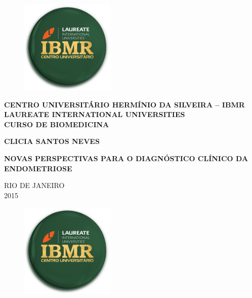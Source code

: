 \documentclass[12pt]{article} %
\begin{document}
\begin{figure}[h!]
\centering
\includegraphics[width=4.5cm]{ibmr.png}
\end{figure}

\begin{center}
\textbf{CENTRO UNIVERSITÁRIO HERMÍNIO DA SILVEIRA – IBMR \\
LAUREATE INTERNATIONAL UNIVERSITIES \\
CURSO DE BIOMEDICINA}
\end{center}

\vspace{2.5cm}

\begin{center}
\MakeUppercase{\textbf{Clicia Santos Neves}}
\end{center}

\vspace{3.5cm}

\begin{center}
\MakeUppercase{\textbf{Novas perspectivas para o diagnóstico clínico da endometriose}}
\end{center}

\vspace{5.5cm}

\begin{center}
\MakeUppercase{Rio de Janeiro}\\
2015
\end{center}

\newpage


\begin{figure}[h!]
\centering
\includegraphics[width=4.5cm]{ibmr.png}
\end{figure}
\end{document}
